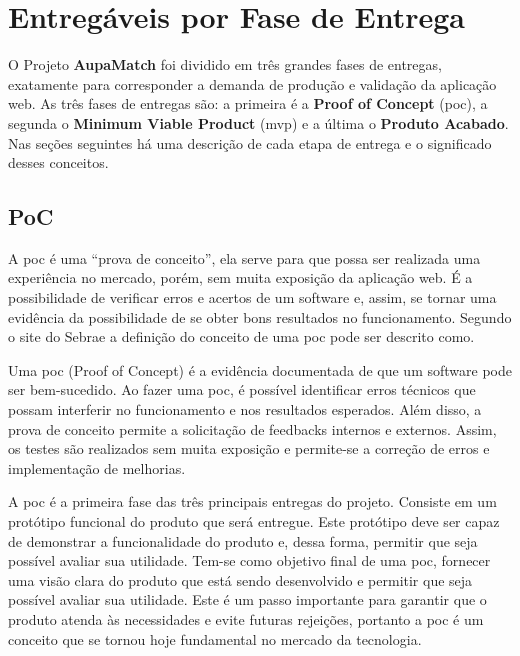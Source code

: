     \section{Entregáveis por Fase de Entrega}
    O Projeto \textbf{AupaMatch} foi dividido em três grandes fases de entregas, exatamente para corresponder a demanda de produção e validação da aplicação web. As três fases de entregas são: a primeira é a \textbf{Proof of Concept} (\ac{poc}), a segunda o \textbf{Minimum Viable Product} (\ac{mvp}) e a última o \textbf{Produto Acabado}. Nas seções seguintes há uma descrição de cada etapa de entrega e o significado desses conceitos.

    \subsection{PoC}
    A \ac{poc} é uma “prova de conceito”, ela serve para que possa ser realizada uma experiência no mercado, porém, sem muita exposição da aplicação web. É a possibilidade de verificar erros e acertos de um software e, assim, se tornar uma evidência da possibilidade de se obter bons resultados no funcionamento.
    Segundo o site do Sebrae a definição do conceito de uma \ac{poc} pode ser descrito como.
    
    \begin{citacao}
        Uma \ac{poc} (Proof of Concept) é a evidência documentada de que um software pode ser bem-sucedido. Ao fazer uma \ac{poc}, é possível identificar erros técnicos que possam interferir no funcionamento e nos resultados esperados. Além disso, a prova de conceito permite a solicitação de \gls{feedbacks} internos e externos. Assim, os testes são realizados sem muita exposição e permite-se a correção de erros e implementação de melhorias.
        \cite{sebrae2018}
    \end{citacao}
    
    A \ac{poc} é a primeira fase das três principais entregas do projeto. Consiste em um protótipo funcional do produto que será entregue. Este protótipo deve ser capaz de demonstrar a funcionalidade do produto e, dessa forma, permitir que seja possível avaliar sua utilidade. Tem-se como objetivo final de uma \ac{poc}, fornecer uma visão clara do produto que está sendo desenvolvido e permitir que seja possível avaliar sua utilidade. Este é um passo importante para garantir que o produto atenda às necessidades e evite futuras rejeições, portanto a \ac{poc} é um conceito que se tornou hoje fundamental no mercado da tecnologia.
        
